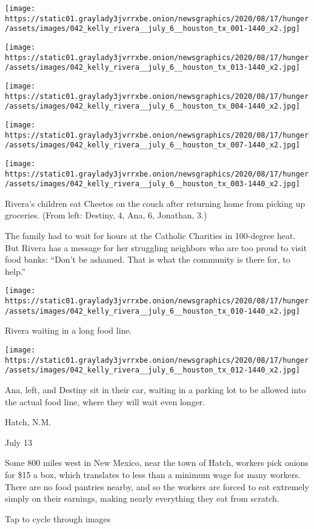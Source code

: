 \texttt{[image: https://static01.graylady3jvrrxbe.onion/newsgraphics/2020/08/17/hunger/assets/images/042\_kelly\_rivera\_\_july\_6\_\_houston\_tx\_001-1440\_x2.jpg]}

\texttt{[image: https://static01.graylady3jvrrxbe.onion/newsgraphics/2020/08/17/hunger/assets/images/042\_kelly\_rivera\_\_july\_6\_\_houston\_tx\_013-1440\_x2.jpg]}

\texttt{[image: https://static01.graylady3jvrrxbe.onion/newsgraphics/2020/08/17/hunger/assets/images/042\_kelly\_rivera\_\_july\_6\_\_houston\_tx\_004-1440\_x2.jpg]}

\texttt{[image: https://static01.graylady3jvrrxbe.onion/newsgraphics/2020/08/17/hunger/assets/images/042\_kelly\_rivera\_\_july\_6\_\_houston\_tx\_007-1440\_x2.jpg]}

\texttt{[image: https://static01.graylady3jvrrxbe.onion/newsgraphics/2020/08/17/hunger/assets/images/042\_kelly\_rivera\_\_july\_6\_\_houston\_tx\_003-1440\_x2.jpg]}

Rivera's children eat Cheetos on the couch after returning home from
picking up groceries. (From left: Destiny, 4, Ana, 6, Jonathan, 3.)

The family had to wait for hours at the Catholic Charities in 100-degree
heat. But Rivera has a message for her struggling neighbors who are too
proud to visit food banks: ``Don't be ashamed. That is what the
community is there for, to help.''

\texttt{[image: https://static01.graylady3jvrrxbe.onion/newsgraphics/2020/08/17/hunger/assets/images/042\_kelly\_rivera\_\_july\_6\_\_houston\_tx\_010-1440\_x2.jpg]}

Rivera waiting in a long food line.

\texttt{[image: https://static01.graylady3jvrrxbe.onion/newsgraphics/2020/08/17/hunger/assets/images/042\_kelly\_rivera\_\_july\_6\_\_houston\_tx\_012-1440\_x2.jpg]}

Ana, left, and Destiny sit in their car, waiting in a parking lot to be
allowed into the actual food line, where they will wait even longer.

Hatch, N.M.

July 13

Some 800 miles west in New Mexico, near the town of Hatch, workers pick
onions for \$15 a box, which translates to less than a minimum wage for
many workers. There are no food pantries nearby, and so the workers are
forced to eat extremely simply on their earnings, making nearly
everything they eat from scratch.

Tap to cycle through images

